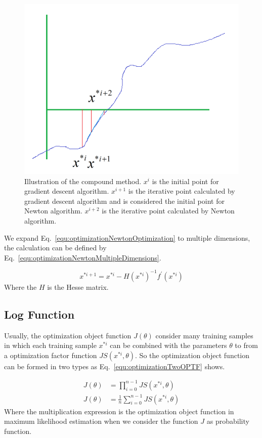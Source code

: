 \documentclass[runningheads,openany]{xhlPaper}
\begin{document}
\begin{figure}
\centering
\includegraphics[width=0.7\linewidth]{optimizationGradientToNewton}
\caption{Illustration of the compound method. $x^{i}$ is the initial point for gradient descent algorithm. $x^{i + 1}$ is the iterative point calculated by gradient descent algorithm and is considered the initial point for Newton algorithm. $x^{i + 2}$ is the iterative point calculated by Newton algorithm.}
\label{fig:optimizationGradientToNewton}
\end{figure}

We expand Eq.~\ref{equ:optimizationNewtonOptimization} to multiple dimensions, the calculation can be defined by Eq.~\ref{equ:optimizationNewtonMultipleDimensions}.

\begin{equation}
\label{equ:optimizationNewtonMultipleDimensions}
{x^{*i + 1}} = {x^{*i}} - H{\left( {{x^{*i}}} \right)^{ - 1}}{f^{'}}\left( {{x^{*i}}} \right)
\end{equation}
Where the $H$ is the Hesse matrix.

\subsection{Log Function}
\label{sec:logFunction}
Usually, the optimization object function $J\left(\theta\right)$ consider many training samples in which each training sample $x^{* i}$ can be combined with the parameters $\theta$ to from a optimization factor function $JS\left( {{x^{* i}},\theta } \right)$. So the optimization object function can be formed in two types as Eq.~\ref{equ:optimizationTwoOPTF} shows.

\begin{equation}
\label{equ:optimizationTwoOPTF}
\begin{aligned}
J\left( \theta  \right) &= \prod\limits_{i = 0}^{n - 1} {JS\left( {{x^{* i}},\theta } \right)} \\
J\left( \theta  \right) &= \frac{1}{n}\sum\limits_{i = 0}^{n - 1} {JS\left( {{x^{* i}},\theta } \right)} 
\end{aligned}
\end{equation}
Where the multiplication expression is the optimization object function in maximum likelihood estimation when we consider the function $J$ as probability function.
\end{document}
